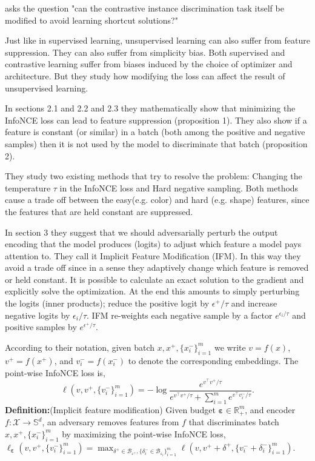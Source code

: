 \documentclass[../thesis.tex]{subfiles}
\begin{document}
	\cite{ifm_ssl_avoid_shortcuts} asks the question "can the contrastive instance discrimination task itself be modified to avoid learning shortcut solutions?"
	
	Just like in supervised learning, unsupervised learning can also suffer from feature suppression. They can also suffer from simplicity bias. Both supervised and contrastive learning suffer from biases induced by the choice of optimizer and
	architecture. But they study how modifying the loss can affect the result of unsupervised learning. 
	
	In sections 2.1 and 2.2 and 2.3 they mathematically show that minimizing the InfoNCE loss can lead to feature suppression (proposition 1). They also show if a feature is constant (or similar) in a batch (both among the positive and negative samples) then it is not used by the model to discriminate that batch (proposition 2). 
	
	
	They study two existing methods that try to resolve the problem: Changing the temperature $\tau$ in the InfoNCE loss and Hard negative sampling. Both methods cause a trade off between the easy(e.g. color) and hard (e.g. shape) features, since the features that are held constant are suppressed.
	
	In section 3 they suggest that we should adversarially perturb the output encoding that the model produces (logits) to adjust which feature a model pays attention to. They call it Implicit Feature Modification (IFM). In this way they avoid a trade off since in a sense they adaptively change which feature is removed or held constant. It is possible to calculate an exact solution to the gradient and explicitly solve the optimization. At the end this amounts to simply perturbing the logits (inner products); reduce the positive logit by $\epsilon^+/\tau$ and
	increase negative logits by $\epsilon_i/\tau$. IFM re-weights each negative sample by a factor $e ^{\epsilon_i/\tau}$ and positive samples by $e^{\epsilon^+/\tau}$.
	
	
	According to their notation, given batch $x,x^+,\{x^-_i\}_{i=1}^m$ we write $v=f(x)$, $v^+=f(x^+)$, and $v_i^-=f(x_i^-)$ to denote the corresponding embeddings. The point-wise InfoNCE loss is,
	\begin{equation*}
	\ell(v,v^+, \{ v^-_i\}_{i=1}^m) = - \log \frac{e^{v^\top v^+/ \tau}}{e^{v^\top v^+ / \tau} + \sum_{i=1}^m e^{v^\top v^-_i/ \tau}}.
	\end{equation*}
	\textbf{Definition:}(Implicit feature modification)\label{principle: motivating adv framework} Given budget $\bm{\varepsilon} \in \mathbb{R}^m_+$, and encoder $f : \mathcal X \rightarrow \mathbb{S}^d$, an adversary removes features from $f$ that discriminates batch $x,x^+,\{x^-_i\}_{i=1}^m$ by maximizing the point-wise InfoNCE loss,
	$
	\ell_{\bm{\varepsilon}}(v,v^+, \{ v^-_i \}_{i=1}^m)= \max_{\delta^+ \in \mathcal B_{\varepsilon^+}, \{\delta_i^- \in \mathcal B_{\varepsilon_i} \}_{i=1}^m} \ell(v,v^+ + \delta^+, \{ v^-_i + \delta^-_i\}_{i=1}^m)$.
	
\end{document}
